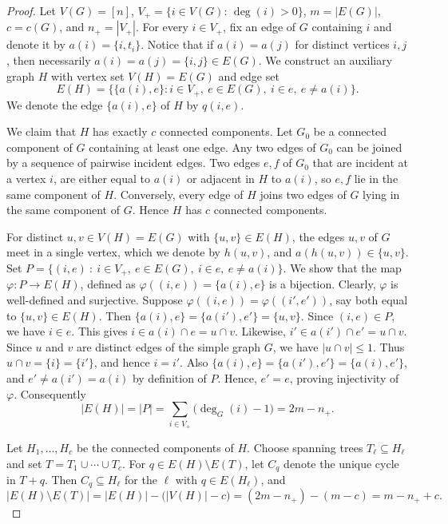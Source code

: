 \documentclass[12pt]{amsart}
\begin{document}
			\begin{proof}
				Let $V(G)=[n]$, $V_+=\{i\in V(G):\, \deg(i)>0\}$, $m=|E(G)|$, $c=c(G)$, and $n_+=|V_+|$.
				For every $i\in V_+$, fix an edge of $G$ containing $i$ and denote it by $a(i)=\{i,t_i\}$. Notice that if $a(i)=a(j)$ for distinct vertices $i,j$, then necessarily $a(i)=a(j)=\{i,j\}\in E(G)$. We construct an auxiliary graph $H$ with vertex set $V(H)=E(G)$ and edge set
				\[
				E(H)=\{\{a(i),e\}:i\in V_+,\ e\in E(G),\ i\in e,\ e\neq a(i)\}.
				\]
				We denote the edge $\{a(i),e\}$ of $H$ by $q(i,e)$.
				
				We claim that $H$ has exactly $c$ connected components. Let $G_0$ be a connected component of $G$ containing at least one edge. Any two edges of $G_0$ can be joined by a sequence of pairwise incident edges. Two edges $e,f$ of $G_0$ that are incident at a vertex $i$, are either  equal to $a(i)$ or adjacent in $H$ to $a(i)$, so $e,f$ lie in the same component of $H$. Conversely, every edge of $H$ joins two edges of $G$ lying in the same component of $G$. Hence $H$ has $c$ connected components.
				
For distinct $u,v\in V(H)=E(G)$ with $\{u,v\}\in E(H)$, the edges $u,v$ of $G$ meet in a single vertex, which we denote by $h(u,v)$, and $a(h(u,v))\in\{u,v\}$. 
Set $P=\big\{(i,e)\ :\ i\in V_+,\ e\in E(G),\ i\in e,\ e\neq a(i)\big\}$. We show that the map
$\varphi:P\longrightarrow E(H)$,
defined as $\varphi((i,e))=\{a(i),e\}$
is a bijection. Clearly, $\varphi$ is well-defined and surjective.  	
Suppose $\varphi((i,e))=\varphi((i',e'))$, say both equal to $\{u,v\}\in E(H)$. Then $\{a(i),e\}=\{a(i'),e'\}=\{u,v\}$. 
	Since $(i,e)\in P$, we have $i\in e$. This gives
$i\in a(i)\cap e= u\cap v$.
	Likewise, $i'\in a(i')\cap e'=u\cap v$.
	Since $u$ and $v$ are distinct edges of the simple graph $G$, we have $|u\cap v|\le 1$. Thus
	$u\cap v=\{i\}=\{i'\}$,
	and hence $i=i'$.
	Also $\{a(i),e\}=\{a(i'),e'\}=\{a(i),e'\}$, and $e'\neq a(i')=a(i)$ by definition of $P$. Hence, $e'=e$,  proving injectivity of $\varphi$. Consequently
	\[ 
	|E(H)|=|P|=\sum_{i\in V_+}\big(\deg_G(i)-1\big)=2m-n_+.
	\]
				
Let $H_1,\dots,H_c$ be the connected components of $H$. Choose spanning trees $T_\ell\subseteq H_\ell$ and set $T=T_1\cup\cdots\cup T_c$. For $q\in E(H)\setminus E(T)$, let $C_q$ denote the unique cycle in $T+q$. Then $C_q\subseteq H_\ell$ for the $\ell$ with $q\in E(H_\ell)$, and
				\[
				|E(H)\setminus E(T)|=|E(H)|-\big(|V(H)|-c\big)=(2m-n_+)-(m-c)=m-n_++c.
				\]
				

\end{proof}
\end{document}
